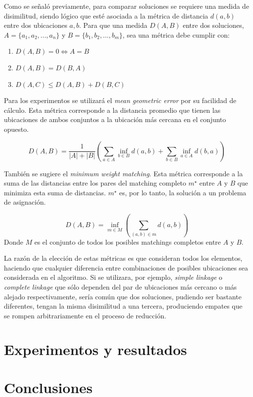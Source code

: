 \documentclass{article}
\begin{document}
Como se señaló previamente, para comparar soluciones se requiere una medida de disimilitud, siendo lógico que esté asociada a la métrica de distancia $d(a,b)$ entre dos ubicaciones $a,b$. Para que una medida $D(A,B)$ entre dos soluciones, $A = \{a_1,a_2,...,a_n\}$ y $B = \{b_1,b_2,...,b_m\}$, sea una métrica debe cumplir con:

\begin{enumerate}
\item $D(A,B) = 0 \Leftrightarrow A=B$
\item $D(A,B) = D(B,A)$
\item $D(A,C) \leq D(A,B) + D(B,C)$
\end{enumerate}

Para los experimentos se utilizará el \emph{mean geometric error} por su facilidad de cálculo. Esta métrica corresponde a la distancia promedio que tienen las ubicaciones de ambos conjuntos a la ubicación más cercana en el conjunto opuesto.

\begin{equation}
D(A,B) = \frac{1}{|A|+|B|}\left(\sum_{a \in A}\inf_{b \in B}d(a,b) +
\sum_{b \in B}\inf_{a \in A}d(b,a)\right)
\end{equation}

También se sugiere el \emph{minimum weight matching}. Esta métrica corresponde a la suma de las distancias entre los pares del matching completo $m^\star$ entre $A$ y $B$ que minimiza esta suma de distancias. $m^\star$ es, por lo tanto, la solución a un problema de asignación.

\begin{equation}
D(A,B) = \inf_{m \in M}\left( \sum_{(a,b) \in m} d(a,b)\right)
\end{equation}
Donde $M$ es el conjunto de todos los posibles matchings completos entre $A$ y $B$.

La razón de la elección de estas métricas es que consideran todos los elementos, haciendo que cualquier diferencia entre combinaciones de posibles ubicaciones sea considerada en el algoritmo. Si se utilizara, por ejemplo, \emph{simple linkage} o \emph{complete linkage} que sólo dependen del par de ubicaciones más cercano o más alejado respectivamente, sería común que dos soluciones, pudiendo ser bastante diferentes, tengan la misma disimilitud a una tercera, produciendo empates que se rompen arbitrariamente en el proceso de reducción.

\section{Experimentos y resultados}

\section{Conclusiones}


{}
\end{document}
